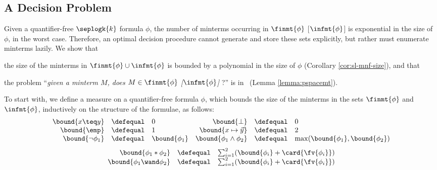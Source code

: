 \subsection{A Decision Problem}
\label{sec:pspacemt}

Given a quantifier-free $\seplogk{k}$ formula $\phi$, the number of
minterms occurring in $\finmt{\phi}$ [$\infmt{\phi}$] is
exponential in the size of $\phi$, in the worst case. Therefore, an
optimal decision procedure cannot generate and store these sets
explicitly, but rather must enumerate minterms lazily. We show
that \begin{inparaenum}[(i)]
\item the size of the minterms in $\finmt{\phi} \cup \infmt{\phi}$ is
  bounded by a polynomial in the size of $\phi$ (Corollary
  \ref{cor:sl-mnf-size}), and that
%
\item the problem ``\emph{given a minterm $M$, does $M \in
  \finmt{\phi}$ [$\infmt{\phi}$]} ?'' is in \pspace\ (Lemma
  \ref{lemma:pspacemt}). \end{inparaenum}

To start with, we define a measure on a quantifier-free formula
$\phi$, which bounds the size of the minterms in the sets
$\finmt{\phi}$ and $\infmt{\phi}$, inductively on the structure of the
formulae, as follows:
\[\begin{array}{rclrcl}
\bound{x \teq y} & \defequal & 0 &
\bound{\bot} & \defequal & 0 \\
\bound{\emp} & \defequal & 1 &
\bound{x \mapsto \vec{y}} & \defequal & 2 \\
\bound{\neg\phi_1} & \defequal & \bound{\phi_1} &
\bound{\phi_1 \wedge \phi_2} & \defequal & \max(\bound{\phi_1},\bound{\phi_2}) \\
\end{array}\]
\[\begin{array}{rcl}
\bound{\phi_1 * \phi_2} & \defequal & \sum_{i=1}^2 (\bound{\phi_i} + \card{\fv{\phi_i}}) \\
\bound{\phi_1 \wand \phi_2} & \defequal & \sum_{i=1}^2 (\bound{\phi_i} + \card{\fv{\phi_i}})
\end{array}\]


